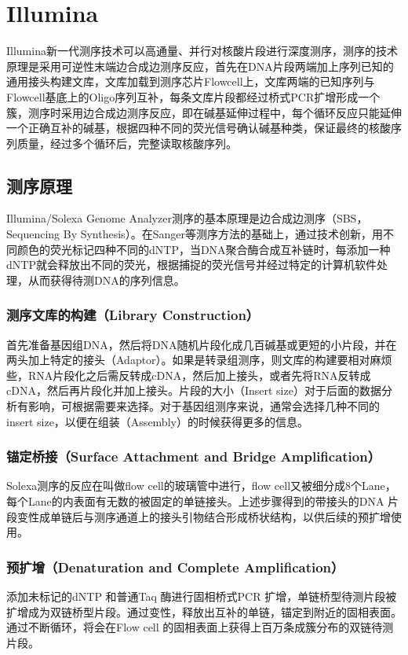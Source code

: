 \chapter{Illumina\textregistered}
	Illumina新一代测序技术可以高通量、并行对核酸片段进行深度测序，测序的技术原理是采用可逆性末端边合成边测序反应，首先在DNA片段两端加上序列已知的通用接头构建文库，文库加载到测序芯片Flowcell上，文库两端的已知序列与Flowcell基底上的Oligo序列互补，每条文库片段都经过桥式PCR扩增形成一个簇，测序时采用边合成边测序反应，即在碱基延伸过程中，每个循环反应只能延伸一个正确互补的碱基，根据四种不同的荧光信号确认碱基种类，保证最终的核酸序列质量，经过多个循环后，完整读取核酸序列。
	
	\section{测序原理}
	Illumina/Solexa Genome Analyzer测序的基本原理是边合成边测序（SBS，Sequencing By Synthesis）。在Sanger等测序方法的基础上，通过技术创新，用不同颜色的荧光标记四种不同的dNTP，当DNA聚合酶合成互补链时，每添加一种dNTP就会释放出不同的荧光，根据捕捉的荧光信号并经过特定的计算机软件处理，从而获得待测DNA的序列信息。
	
	\subsection{测序文库的构建（Library Construction）}
	首先准备基因组DNA，然后将DNA随机片段化成几百碱基或更短的小片段，并在两头加上特定的接头（Adaptor）。如果是转录组测序，则文库的构建要相对麻烦些，RNA片段化之后需反转成cDNA，然后加上接头，或者先将RNA反转成cDNA，然后再片段化并加上接头。片段的大小（Insert size）对于后面的数据分析有影响，可根据需要来选择。对于基因组测序来说，通常会选择几种不同的insert size，以便在组装（Assembly）的时候获得更多的信息。
	
	\subsection{锚定桥接（Surface Attachment and Bridge Amplification）}
	Solexa测序的反应在叫做flow cell的玻璃管中进行，flow cell又被细分成8个Lane，每个Lane的内表面有无数的被固定的单链接头。上述步骤得到的带接头的DNA 片段变性成单链后与测序通道上的接头引物结合形成桥状结构，以供后续的预扩增使用。
	
	\subsection{预扩增（Denaturation and Complete Amplification）}
	添加未标记的dNTP 和普通Taq 酶进行固相桥式PCR 扩增，单链桥型待测片段被扩增成为双链桥型片段。通过变性，释放出互补的单链，锚定到附近的固相表面。通过不断循环，将会在Flow cell 的固相表面上获得上百万条成簇分布的双链待测片段。
	
